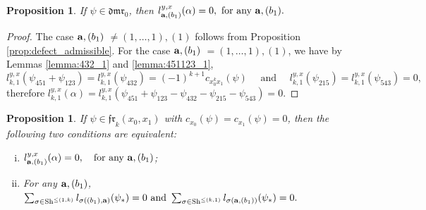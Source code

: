 \documentclass[a4paper,fleqn]{cas-sc}
\newtheorem{proposition}[theorem]{Proposition}
\begin{document}
\begin{proposition}\label{prop:defect nonadmissible}
	If $\psi\in \mathfrak{dmr}_0$, then
	$
		l^{y,x}_{{\bf{a}},(b_1)}(\alpha)=0, \text{ for any ${\bf{a}},(b_1)$}.
	$
\end{proposition}

\begin{proof}
The case $\bold a, (b_1)$ $\ne (1,\ldots,1),(1)$ follows from Proposition \ref{prop:defect_admissible}. For the case $\bold a, (b_1)$ $=(1,\ldots,1),(1)$, we have by Lemmas \ref{lemma:432_1} and \ref{lemma:451123_1},
\begin{equation*}
l^{y,x}_{k,1}(\psi_{451}+\psi_{123})=l^{y,x}_{k,1}(\psi_{432})=(-1)^{k+1}c_{x^k_0x_1}(\psi) \quad \text{ and } \quad l^{y,x}_{k,1}(\psi_{215})=l^{y,x}_{k,1}(\psi_{543})=0,
\end{equation*}
therefore
$
l^{y,x}_{k,1}(\alpha)=l^{y,x}_{k,1}(\psi_{451}+\psi_{123}-\psi_{432}-\psi_{215}-\psi_{543})=0.
$
\end{proof}

\begin{proposition} \label{prop:one_loop_double_shuffle}
    If $\psi\in \mathfrak{fr}_k(x_0,x_1)$ with $c_{x_0}(\psi)=c_{x_1}(\psi)=0$, then the following two conditions are equivalent:
	\begin{enumerate}[(i)] %
		\item \label{prop:one_loop_double_shuffle-1}
        $l^{y,x}_{{\bf{a}},(b_1)}(\alpha)=0,\quad \text{for any ${\bf{a}},(b_1)$}$;
		\item \label{prop:one_loop_double_shuffle-2}
        For any ${\bf{a}},(b_1)$, 
        $
            \sum_{\sigma\in \text{Sh}^{\le (1,k)}}
        l_{\sigma\left((b_1),{\bf{a}}\right)}(\psi_{*})=0 \text{ and } \sum_{\sigma\in \text{Sh}^{\le (k,1)}}l_{\sigma\left({\bf{a}},(b_1)\right)}(\psi_{*})=0. 
        $
	\end{enumerate}
\end{proposition}
\end{document}
